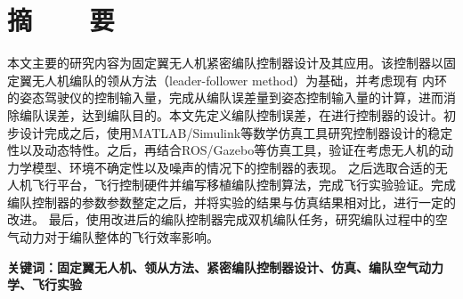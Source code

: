 \topskip=0pt

\vspace*{-7mm}

\begin{center}
  \heiti{}\textbf{\thesisTitle}
\end{center}

\vspace*{2mm}

{\let\clearpage\relax \chapter*{\textmd{摘~~~~要}}}
\setcounter{page}{1}

\vspace*{1mm}

\setlength{\parskip}{0em}

本文主要的研究内容为固定翼无人机紧密编队控制器设计及其应用。该控制器以固定翼无人机编队的领从方法（leader-follower method）为基础，并考虑现有
内环的姿态驾驶仪的控制输入量，完成从编队误差量到姿态控制输入量的计算，进而消除编队误差，达到编队目的。本文先定义编队控制误差，在进行控制器的设计。初步设计完成之后，使用MATLAB/Simulink等数学仿真工具研究控制器设计的稳定性以及动态特性。之后，再结合ROS/Gazebo等仿真工具，验证在考虑无人机的动力学模型、环境不确定性以及噪声的情况下的控制器的表现。
之后选取合适的无人机飞行平台，飞行控制硬件并编写移植编队控制算法，完成飞行实验验证。完成编队控制器的参数参数整定之后，并将实验的结果与仿真结果相对比，进行一定的改进。
最后，使用改进后的编队控制器完成双机编队任务，研究编队过程中的空气动力对于编队整体的飞行效率影响。

\vspace{4ex}\noindent\textbf{\heiti 关键词：固定翼无人机、领从方法、紧密编队控制器设计、仿真、编队空气动力学、飞行实验}
\newpage

\topskip=0pt

\vspace*{2mm}

\begin{spacing}{0.95}
  \centering
  \heiti{}\textbf{\thesisTitleEN}
\end{spacing}

